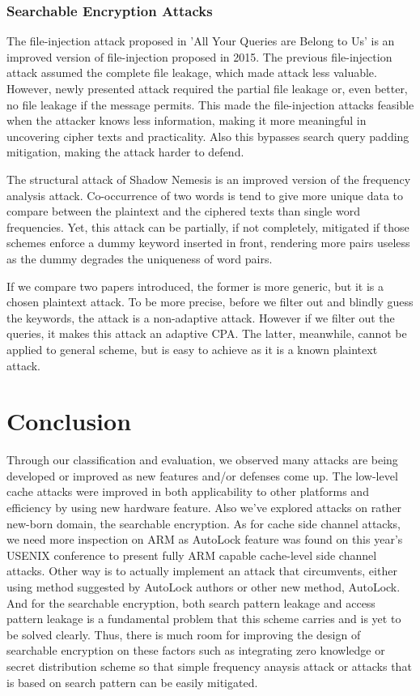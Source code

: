\documentclass[a4paper]{article}
\begin{document}
\subsubsection{Searchable Encryption Attacks}

The file-injection attack proposed in 'All Your Queries are Belong to Us' is an improved version of file-injection proposed in 2015. The previous file-injection attack assumed the complete file leakage, which made attack less valuable. However, newly presented attack required the partial file leakage or, even better, no file leakage if the message permits. This made the file-injection attacks feasible when the attacker knows less information, making it more meaningful in uncovering cipher texts and practicality. Also this bypasses search query padding mitigation, making the attack harder to defend.
\par The structural attack of Shadow Nemesis is an improved version of the frequency analysis attack. Co-occurrence of two words is tend to give more unique data to compare between the plaintext and the ciphered texts than single word frequencies. Yet, this attack can be partially, if not completely, mitigated if those schemes enforce a dummy keyword inserted in front, rendering more pairs useless as the dummy degrades the uniqueness of word pairs.
\par If we compare two papers introduced, the former is more generic, but it is a chosen plaintext attack. To be more precise, before we filter out and blindly guess the keywords, the attack is a non-adaptive attack. However if we filter out the queries, it makes this attack an adaptive CPA. The latter, meanwhile, cannot be applied to general scheme, but is easy to achieve as it is a known plaintext attack.

\section{Conclusion}

Through our classification and evaluation, we observed many attacks are being developed or improved as new features and/or defenses come up. The low-level cache attacks were improved in both applicability to other platforms and efficiency by using new hardware feature. Also we've explored attacks on rather new-born domain, the searchable encryption. As for cache side channel attacks, we need more inspection on ARM as AutoLock \cite{green2017autolock} feature was found on this year's USENIX conference to present fully ARM capable cache-level side channel attacks. Other way is to actually implement an attack that circumvents, either using method suggested by AutoLock authors or other new method, AutoLock. And for the searchable encryption, both search pattern leakage and access pattern leakage is a fundamental problem that this scheme carries and is yet to be solved clearly. Thus, there is much room for improving the design of searchable encryption on these factors such as integrating zero knowledge or secret distribution scheme so that simple frequency anaysis attack or attacks that is based on search pattern can be easily mitigated.
\end{document}
